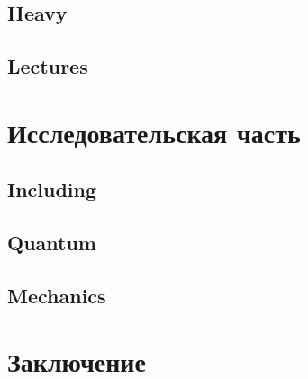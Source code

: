 \documentclass[a4paper,oneside,14pt]{extarticle}
\begin{document}
\subsection{Heavy}
\subsection{Lectures}
\Blindtext
\newpage
\section{Исследовательская часть}
\subsection{Including}
\subsection{Quantum}
\subsection{Mechanics}
\Blindtext
\newpage
\section*{Заключение}
\Blindtext \cite{test} \cite{linux} \cite{amd}

\newpage



\Blindtext
\end{document}
